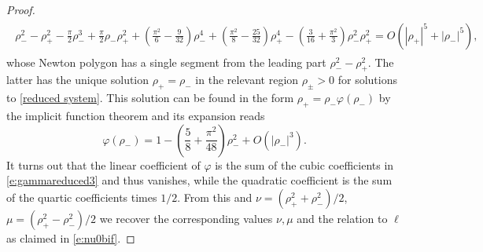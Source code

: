 \documentclass{article}
\numberwithin{equation}{section}
\begin{document}
\begin{proof}
		 	\begin{align}\label{e:gammareduced3}\begin{split}
		 			\rho_-^2-\rho_+^2 
		 			-\frac{\pi}{2}\rho_-^3 
		 			+\frac{\pi}{2}  \rho_- \rho_+^2
		 			+\left(\tfrac{\pi ^2 }{6} -\tfrac{9}{32}\right)\rho_-^4
		 			+\left(\tfrac{\pi ^2}{8}-\tfrac{25}{32}\right)\rho_+^4
		 			-\left(\tfrac{3}{16}+\tfrac{\pi ^2}{3} \right) \rho_-^2 \rho_+^2
		 			= O(|\rho_+|^5 + |\rho_-|^5),
		 	\end{split}\end{align}
		 	whose Newton polygon has a single segment from the leading part $\rho_-^2-\rho_+^2$. The latter has the unique solution $\rho_+=\rho_-$ in the relevant region $\rho_\pm>0$ for solutions to \eqref{reduced system}. This solution can be found in the form $\rho_+=\rho_- \varphi(\rho_-)$ by the implicit function theorem and its expansion reads 
		 	\[
		 	\varphi(\rho_-) = 1 -\left(\frac{5}{8}+\frac{\pi^2}{48}\right)  \rho_-^2 + O(|\rho_-|^3).
		 	\]
		 	It turns out that the linear coefficient of $\varphi$ is the sum of the cubic coefficients in \eqref{e:gammareduced3} and thus vanishes, while the quadratic coefficient is the sum of the quartic coefficients times $1/2$. From this and $\nu = \left(\rho_+^2+ \rho_-^2\right)/2$, $\mu = \left(\rho_+^2- \rho_-^2\right)/2$ we recover the corresponding values $\nu, \mu$ and the relation to $\ell$ as claimed in \eqref{e:nu0bif}.
		 	

\end{proof}
\end{document}
